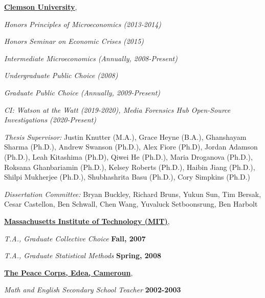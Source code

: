 \documentclass[10pt]{article}
\newenvironment{outerlist}[1][\enskip\textbullet]%
        {\begin{itemize}[#1]}{\end{itemize}%
         \vspace{-.6\baselineskip}}
\newenvironment{innerlist}[1][\enskip\textbullet]%
        {\begin{compactitem}[#1]}{\end{compactitem}}
\begin{document}
\begin{outerlist}
\item{}\href{http://www.clemson.edu/}{\textbf{Clemson University}},
\begin{innerlist}

\item[] \textit{Honors Principles of Microeconomics (2013-2014)}%

\item[] \textit{Honors Seminar on Economic Crises (2015)}%

\item[] \textit{Intermediate Microeconomics (Annually, 2008-Present)}%

\item[] \textit{Undergraduate Public Choice (2008)}%

\item[] \textit{Graduate Public Choice (Annually, 2009-Present)}%

\item[] \textit{CI: Watson at the Watt (2019-2020), Media Forensics Hub Open-Source Investigations (2020-Present)}%

\item[] \textit{Thesis Supervisor:} Justin Knutter (M.A.), Grace Heyne (B.A.), Ghanshayam Sharma (Ph.D.), Andrew Swanson (Ph.D.), Alex Fiore (Ph.D), Jordan Adamson (Ph.D.), Leah Kitashima (Ph.D), Qiwei He (Ph.D.), Maria Droganova (Ph.D.), Roksana Ghanbariamin (Ph.D.), Kelsey Roberts (Ph.D.), Haibin Jiang (Ph.D.), Shilpi Mukherjee (Ph.D.),  Shubhashrita Basu (Ph.D.), Cory Simpkins (Ph.D.) %
\item[] \textit{Dissertation Committee:} Bryan Buckley, Richard Bruns, Yukun Sun, Tim Bersak, Cesar Castellon, Ben Schwall, Chen Wang, Yuvaluck Setboonsrung, Ben Harbolt   %

\end{innerlist}

\item{}\href{http://www.mit.edu/}{\textbf{Massachusetts Institute of Technology (MIT)}},
\begin{innerlist}

\item[] \textit{T.A., Graduate Collective Choice }%
        \hfill \textbf{Fall, 2007}

\item[] \textit{T.A., Graduate Statistical Methods }%
        \hfill \textbf{Spring, 2008}
\end{innerlist}
\item{}\href{http://www.peacecorps.gov/}{\textbf{The Peace Corps, Edea, Cameroun}},
\begin{innerlist}
    \item[]\textit{Math and English Secondary School Teacher}
                \hfill \textbf{2002-2003}
\end{innerlist}

\end{outerlist}
\end{document}
